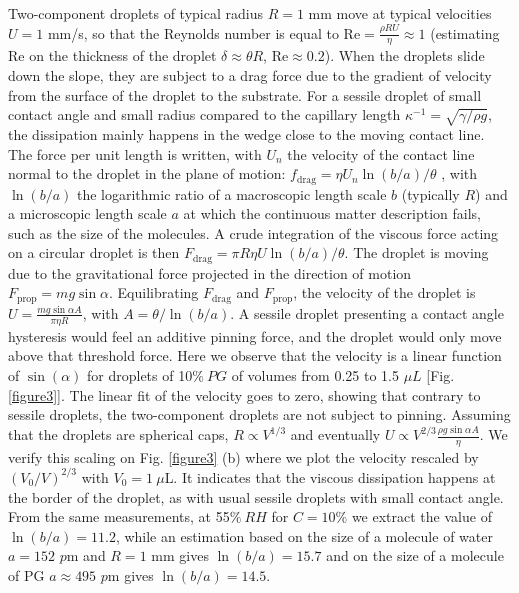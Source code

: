 \documentclass[aps,prl,reprint,superscriptaddress,amsmath,amssymb,]{revtex4-1}
\begin{document}
Two-component droplets of typical radius $R=1$ mm move at typical velocities $U=1$ mm/s, so that the Reynolds number is equal to $\mathrm{Re}=\frac{\rho R U}{\eta}\approx 1$ (estimating Re on the thickness of the droplet $\delta \approx \theta R$, $\mathrm{Re}\approx 0.2$). When the droplets slide down the slope, they are subject to a drag force due to the gradient of velocity from the surface of the droplet to the substrate. For a sessile droplet of small contact angle and small radius compared to the capillary length $\kappa^{-1}=\sqrt{\gamma/\rho g}$, the dissipation mainly happens in the wedge close to the moving contact line. The force per unit length is written, with $U_n$ the velocity of the contact line normal to the droplet in the plane of motion: $f_\mathrm{drag}=\eta U_n \ln (b/a) / \theta$ \cite{deGennes-1985}, with $\ln (b/a)$ the logarithmic ratio of a macroscopic length scale $b$ (typically $R$) and a microscopic length scale $a$ at which the continuous matter description fails, such as the size of the molecules. A crude integration of the viscous force acting on a circular droplet is then $F_\mathrm{drag}= \pi R \eta U \ln (b/a) / \theta$. The droplet is moving due to the gravitational force projected in the direction of motion $F_\mathrm{prop}=mg \sin{\alpha}$. Equilibrating $F_\mathrm{drag}$ and $F_\mathrm{prop}$, the velocity of the droplet is $U = \frac{mg \sin{\alpha} A}{\pi \eta R}$, with $A= \theta /\ln(b/a) $. A sessile droplet presenting a contact angle hysteresis would feel an additive pinning force, and the droplet would only move above that threshold force. Here we observe that the velocity is a linear function of $\sin(\alpha)$ for droplets of 10$\%~PG$ of volumes from 0.25 to 1.5 $\mu L$ [Fig. \ref{figure3}]. The linear fit of the velocity goes to zero, showing that contrary to sessile droplets, the two-component droplets are not subject to pinning. Assuming that the droplets are spherical caps, $R \propto V^{1/3}$ and eventually $U \propto V^{2/3} \frac{\rho  g \sin{\alpha} A}{ \eta}$. We verify this scaling on Fig. \ref{figure3} (b) where we plot the velocity rescaled by $(V_0/V)^{2/3}$ with $V_0=1~ \mu$L. It indicates that the viscous dissipation happens at the border of the droplet, as with usual sessile droplets with small contact angle. From the same measurements, at 55$\%~RH$ for $C=10\%$ we extract the value of $\ln(b/a)=11.2$, while an estimation based on the size of a molecule of water $a=152$ $p$m and $R=1$ mm gives $\ln(b/a)=15.7$ and on the size of a molecule of PG $a\approx495$ $p$m gives $\ln(b/a)=14.5$.\\
\end{document}
